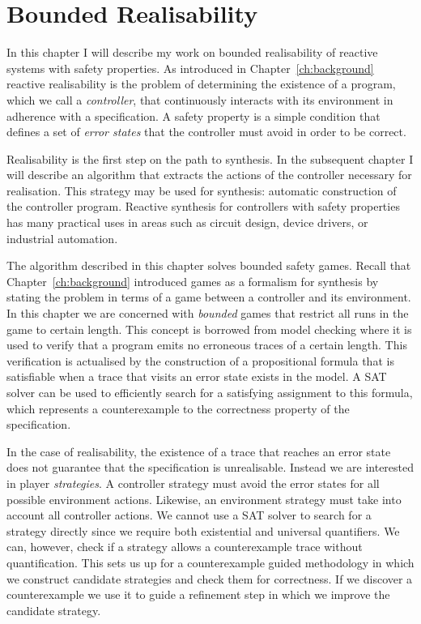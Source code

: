 \chapter{Bounded Realisability}
\label{ch:bounded}

\newtheorem*{exmp}{Example}
\newtheorem*{exmpI}{Example: Intuition behind the algorithm}

In this chapter I will describe my work on bounded realisability of reactive systems with safety properties. As introduced in Chapter~\ref{ch:background} reactive realisability is the problem of determining the existence of a program, which we call a \emph{controller}, that continuously interacts with its environment in adherence with a specification. A safety property is a simple condition that defines a set of \emph{error states} that the controller must avoid in order to be correct.

Realisability is the first step on the path to synthesis. In the subsequent chapter I will describe an algorithm that extracts the actions of the controller necessary for realisation. This strategy may be used for synthesis: automatic construction of the controller program. Reactive synthesis for controllers with safety properties has many practical uses in areas such as circuit design, device drivers, or industrial automation.

The algorithm described in this chapter solves bounded safety games. Recall that Chapter~\ref{ch:background} introduced games as a formalism for synthesis by stating the problem in terms of a game between a controller and its environment. In this chapter we are concerned with \emph{bounded} games that restrict all runs in the game to certain length. This concept is borrowed from model checking where it is used to verify that a program emits no erroneous traces of a certain length. This verification is actualised by the construction of a propositional formula that is satisfiable when a trace that visits an error state exists in the model. A SAT solver can be used to efficiently search for a satisfying assignment to this formula, which represents a counterexample to the correctness property of the specification. 

In the case of realisability, the existence of a trace that reaches an error state does not guarantee that the specification is unrealisable.  Instead we are interested in player \emph{strategies}. A controller strategy must avoid the error states for all possible environment actions. Likewise, an environment strategy must take into account all controller actions. We cannot use a SAT solver to search for a strategy directly since we require both existential and universal quantifiers. We can, however, check if a strategy allows a counterexample trace without quantification. This sets us up for a counterexample guided methodology in which we construct candidate strategies and check them for correctness. If we discover a counterexample we use it to guide a refinement step in which we improve the candidate strategy.

